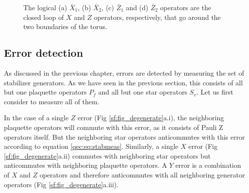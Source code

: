 \begin{figure}
  \centering
  \hspace{1cm}
  \caption{The logical (a) $\bar{X}_1$, (b) $\bar{X}_2$, (c) $\bar{Z}_1$ and (d) $\bar{Z}_2$ operators are the closed loop of $X$ and $Z$ operators, respectively, that go around the two boundaries of the torus. }\label{sf:fig_logical}
\end{figure}

\subsection{Error detection}
As discussed in the previous chapter, errors are detected by measuring the set of stabilizer generators. As we have seen in the previous section, this consists of all but one plaquette operators $P_f$ and all but one star operators $S_v$. Let us first consider to measure all of them.

In the case of a single $Z$ error (Fig \ref{sf:fig_degenerate}a.i), the neighboring plaquette operators will commute with this error, as it consists of Pauli Z operators itself. But the neighboring star operators anticommutes with this error according to equation \ref{qec:eq:stabmeas}. Similarly, a single $X$ error (Fig \ref{sf:fig_degenerate}a.ii) commutes with neighboring star operators but anticommutes with neighboring plaquette operators. A $Y$ error is a combination of $X$ and $Z$ operators and therefore anticommutes with all neighboring generator operators (Fig \ref{sf:fig_degenerate}a.iii).

